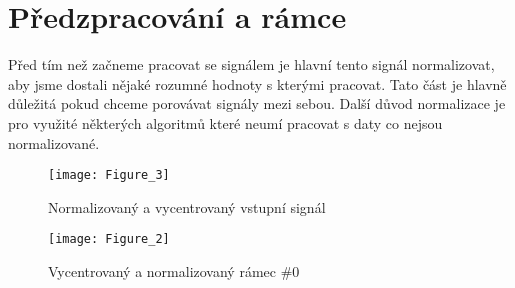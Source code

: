 \section{Předzpracování a rámce}

Před tím než začneme pracovat se signálem je hlavní tento signál normalizovat, aby jsme dostali nějaké rozumné hodnoty s kterými pracovat.
Tato část je hlavně důležitá pokud chceme porovávat signály mezi sebou. Další důvod normalizace je pro využité některých algoritmů které neumí pracovat s daty co nejsou normalizované.

\begin{figure}[H] 
	\centering
	\texttt{[image: Figure\_3]}
	\caption{Normalizovaný a vycentrovaný vstupní signál}
\end{figure}

\begin{figure}[H] 
	\centering
	\texttt{[image: Figure\_2]}
	\caption{Vycentrovaný a normalizovaný rámec \#0}
\end{figure}